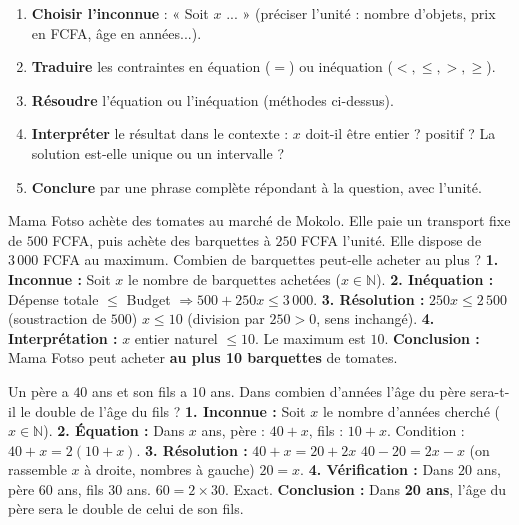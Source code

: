 \documentclass[11pt]{article}
\begin{document}
\begin{methode}
\begin{enumerate}
\item \textbf{Choisir l'inconnue} : « Soit $x$ ... » (préciser l'unité : nombre d'objets, prix en FCFA, âge en années...).
\item \textbf{Traduire} les contraintes en équation ($=$) ou inéquation ($<, \leq, >, \geq$).
\item \textbf{Résoudre} l'équation ou l'inéquation (méthodes ci-dessus).
\item \textbf{Interpréter} le résultat dans le contexte : $x$ doit-il être entier ? positif ? La solution est-elle unique ou un intervalle ?
\item \textbf{Conclure} par une phrase complète répondant à la question, avec l'unité.
\end{enumerate}
\end{methode}

\begin{exoresolu}
Mama Fotso achète des tomates au marché de Mokolo. Elle paie un transport fixe de $500$ FCFA, puis achète des barquettes à $250$ FCFA l'unité. Elle dispose de $3\,000$ FCFA au maximum. Combien de barquettes peut-elle acheter au plus ?
\tcblower
\textbf{1. Inconnue :} Soit $x$ le nombre de barquettes achetées ($x \in \mathbb{N}$).
\textbf{2. Inéquation :} Dépense totale $\leq$ Budget $\Rightarrow 500 + 250x \leq 3\,000$.
\textbf{3. Résolution :}
$250x \leq 2\,500$ (soustraction de $500$)
$x \leq 10$ (division par $250>0$, sens inchangé).
\textbf{4. Interprétation :} $x$ entier naturel $\leq 10$. Le maximum est $10$.
\textbf{Conclusion :} Mama Fotso peut acheter \textbf{au plus 10 barquettes} de tomates.
\end{exoresolu}

\begin{exoresolu}
Un père a $40$ ans et son fils a $10$ ans. Dans combien d'années l'âge du père sera-t-il le double de l'âge du fils ?
\tcblower
\textbf{1. Inconnue :} Soit $x$ le nombre d'années cherché ($x \in \mathbb{N}$).
\textbf{2. Équation :} Dans $x$ ans, père : $40+x$, fils : $10+x$. Condition : $40+x = 2(10+x)$.
\textbf{3. Résolution :}
$40+x = 20+2x$
$40-20 = 2x-x$ (on rassemble $x$ à droite, nombres à gauche)
$20 = x$.
\textbf{4. Vérification :} Dans $20$ ans, père $60$ ans, fils $30$ ans. $60 = 2 \times 30$. Exact.
\textbf{Conclusion :} Dans \textbf{20 ans}, l'âge du père sera le double de celui de son fils.
\end{exoresolu}
\end{document}
